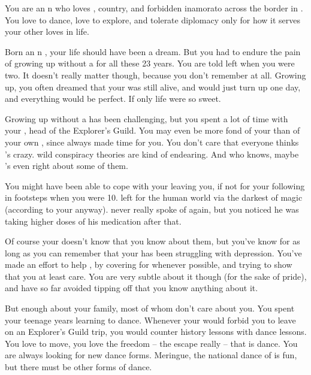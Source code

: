 \documentclass[char]{NeptuneBall}
\begin{document}
\name{\cPrincess{}}


You are an \pAtlantis{}n \cPrincess{\prince} who loves \cPrincess{\them} \cKing{\parent}, \cPrincess{\them} country, and \cPrincess{\them} forbidden inamorato across the border in \pPacifica{}. You love to dance, love to explore, and tolerate diplomacy only for how it serves your other loves in life.

Born an \pAtlantis{}n \cPrincess{\prince}, your life should have been a dream. But you had to endure the pain of growing up without a \cQueen{\parent} for all these 23 years. You are told \cQueen{\they} left when you were two. It doesn't really matter though, because you don't remember \cQueen{\them} at all. Growing up, you often dreamed that your \cQueen{\parent} was still alive, and would just turn up one day, and everything would be perfect. If only life were so sweet.

Growing up without a \cQueen{\parent} has been challenging, but you spent a lot of time with your \cPlant{\uncle} \cPlant{}, head of the Explorer's Guild. You may even be more fond of your \cPlant{\uncle} than of your own \cKing{\parent}, since \cPlant{} always made time for you. You don't care that everyone thinks \cPlant{\they}'s crazy. \cPlant{\Their} wild conspiracy theories are kind of endearing. And who knows, maybe \cPlant{\they}'s even right about some of them.

You might have been able to cope with your \cQueen{\parent} leaving you, if not for your \cAriel{\sibling} following in \cQueen{\them} footsteps when you were 10. \cAriel{} left for the human world via the darkest of magic (according to your \cKing{\parent} anyway). \cKing{\They} never really spoke of \cAriel{\them} again, but you noticed he was taking higher doses of his medication after that.

Of course your \cKing{\parent} doesn't know that you know about them, but you've know for as long as you can remember that your \cKing{\parent} has been struggling with depression. You've made an effort to help \cKing{\them}, by covering for \cKing{\them} whenever possible, and trying to show \cKing{\them} that you at least care. You are very subtle about it though (for the sake of \cKing{\their} pride), and have so far avoided tipping \cKing{\them} off that you know anything about it.

But enough about your family, most of whom don't care about you. You spent your teenage years learning to dance. Whenever your \cKing{\parent} would forbid you to leave on an Explorer's Guild trip, you would counter \cKing{\them} history lessons with dance lessons.  You love to move, you love the freedom -- the escape really -- that is dance. You are always looking for new dance forms. Meringue, the national dance of \pAtlantis{} is fun, but there must be other forms of dance.
\end{document}
